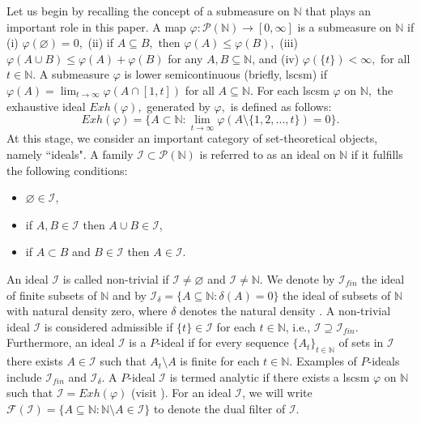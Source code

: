 \documentclass[reqno]{amsart}
\begin{document}
	

Let us begin by recalling the concept of a submeasure on $\mathbb{N}$ that plays an  important role in this paper. A map $\varphi:\mathcal{P}(\mathbb{N})\to [0,\infty]$ is a submeasure on $\mathbb{N}$ if (i) $\varphi(\varnothing)=0,$ (ii)	if $A\subseteq B,$ then $\varphi(A)\leq \varphi(B),$ (iii)	 $\varphi(A\cup B)\leq \varphi(A)+\varphi(B)$ for any $A,B\subseteq\mathbb{N}$, and (iv) $\varphi(\{t\})<\infty,$ for all $t\in\mathbb{N}.$ A  submeasure  $\varphi$ is  lower semicontinuous   (briefly, lscsm) if $\varphi(A)=\displaystyle\lim_{t\to\infty}\varphi(A\cap[1,t])$ for all $A\subseteq\mathbb{N}.$
For each lscsm $\varphi$ on $\mathbb{N},$ the exhaustive ideal $Exh(\varphi),$ generated by $\varphi,$ is defined as follows: 
\begin{equation*}
	Exh(\varphi)=\{A\subset \mathbb{N}:\lim_{t\to\infty}\varphi(A\setminus\{1,2,...,t\})=0\}.
\end{equation*}
At this stage, we consider an important category of set-theoretical objects, namely ``ideals".
A family $\mathcal{I}\subset\mathcal{P}(\mathbb{N})$ is referred to as an ideal \cite{kostyrko2000convergence} on $\mathbb{N}$ if it fulfills the following conditions:
\begin{itemize}
	\item $\varnothing\in\mathcal{I}$,
	\item if $A,B\in \mathcal{I}$ then $A\cup B\in\mathcal{I}$,
	\item if $A\subset B$ and $B\in\mathcal{I}$ then $A\in \mathcal{I}$.
\end{itemize}
An ideal $\mathcal{I}$ is called non-trivial if $\mathcal{I}\neq\varnothing$ and $\mathcal{I}\neq\mathbb{N}$. We denote by $\mathcal{I}_{fin}$ the ideal of finite subsets of $\mathbb{N}$ and by $\mathcal{I}_\delta=\{A\subseteq \mathbb{N}: \delta(A)=0\}$ the ideal of subsets of $\mathbb{N}$ with natural density zero, where $\delta$ denotes the natural density  \cite{fast1951convergence, fridy1985statistical,fridy1993statistical, vsalat1980statistically,steinhaus1951convergence}. A non-trivial ideal $\mathcal{I}$ is considered admissible if $\{t\}\in\mathcal{I}$ for each $t\in\mathbb{N}$, i.e., $\mathcal{I}\supseteq \mathcal{I}_{fin}$. %
Furthermore, an ideal $\mathcal{I}$ is a $P$-ideal \cite{kostyrko2000convergence} if for every sequence $\{A_t\}_{t\in\mathbb{N}}$ of sets in $\mathcal{I}$ there exists  $A\in\mathcal{I}$ such that  $A_t\setminus A$ is finite for each $t\in\mathbb{N}.$ Examples of $P$-ideals include $\mathcal{I}_{fin}$ and $\mathcal{I}_\delta$. A $P$-ideal $\mathcal{I}$ is termed analytic if there exists a lscsm $\varphi$ on $\mathbb{N}$ such that $\mathcal{I}=Exh(\varphi)$ (visit \cite{solecki}). For an ideal $\mathcal{I}$, we will write $\mathcal{F}(\mathcal{I})=\{A\subseteq\mathbb{N}:\mathbb{N}\setminus A\in\mathcal{I}\}$ to denote the dual filter of $\mathcal{I}$.\\
\end{document}
